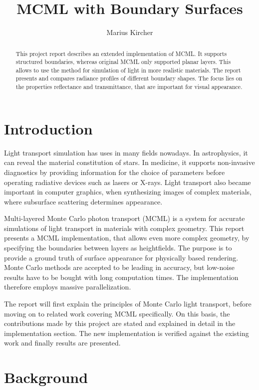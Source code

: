 \documentclass[]{article}
\title{MCML with Boundary Surfaces}
\author{Marius Kircher}
\begin{document}
\maketitle

\begin{abstract}
	This project report describes an extended implementation of MCML. It supports structured boundaries, whereas original MCML only supported planar layers. This allows to use the method for simulation of light in more realistic materials. The report presents and compares radiance profiles of different boundary shapes. The focus lies on the properties reflectance and transmittance, that are important for visual appearance.
\end{abstract}

\section{Introduction}

Light transport simulation has uses in many fields nowadays. In astrophysics, it can reveal the material constitution of stars. In medicine, it supports non-invasive diagnostics by providing information for the choice of parameters before operating radiative devices such as lasers or X-rays. Light transport also became important in computer graphics, when synthesizing images of complex materials, where subsurface scattering determines appearance.

Multi-layered Monte Carlo photon transport\cite{wang1992monte} (MCML) is a system for accurate simulations of light transport in materials with complex geometry. This report presents a MCML implementation, that allows even more complex geometry, by specifying the boundaries between layers as heightfields. The purpose is to provide a ground truth of surface appearance for physically based rendering. Monte Carlo methods are accepted to be leading in accuracy, but low-noise results have to be bought with long computation times. The implementation therefore employs massive parallelization.

The report will first explain the principles of Monte Carlo light transport, before moving on to related work covering MCML specifically. On this basis, the contributions made by this project are stated and explained in detail in the implementation section. The new implementation is verified against the existing work and finally results are presented.

\section{Background}
\end{document}
